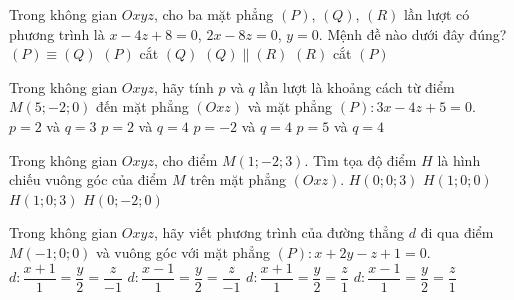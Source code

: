 \begin{ex}%
	Trong không gian $ Oxyz $, cho ba mặt phẳng $ (P) $, $ (Q) $, $ (R) $ lần lượt có phương trình là $ x-4z+8=0 $, $ 2x-8z=0 $, $ y=0 $. Mệnh đề nào dưới đây đúng?
	\choice
	{$ (P) \equiv (Q) $}
	{$ (P) $ cắt $ (Q) $}
	{$ (Q) \parallel (R)$}
	{\True $ (R) $ cắt $ (P) $}
\end{ex}
\begin{ex}%
	Trong không gian $ Oxyz $, hãy tính $ p $ và $ q $ lần lượt là khoảng cách từ điểm $ M(5;-2;0) $ đến mặt phẳng $ (Oxz) $ và mặt phẳng $ (P) \colon 3x-4z+5=0 $.
	\choice
	{$ p=2 $ và $ q=3 $}
	{\True $ p=2 $ và $ q=4 $}
	{$ p=-2 $ và $ q=4 $}
	{$ p=5 $ và $ q=4 $}
\end{ex}
\begin{ex}%
	Trong không gian $ Oxyz $, cho điểm $ M(1;-2;3) $. Tìm tọa độ điểm $ H $ là hình chiếu vuông góc của điểm $ M $ trên mặt phẳng $ (Oxz) $.
	\choice
	{$ H(0;0;3) $}
	{$ H(1;0;0) $}
	{\True $ H(1;0;3) $}
	{$ H(0;-2;0) $}
\end{ex}
\begin{ex}%
	Trong không gian $ Oxyz $, hãy viết phương trình của đường thẳng $ d $ đi qua điểm $ M(-1;0;0) $ và vuông góc với mặt phẳng $ (P) \colon x+2y-z+1=0 $.
	\choice
	{\True $ d \colon \dfrac{x+1}{1}=\dfrac{y}{2}=\dfrac{z}{-1} $}
	{$ d \colon \dfrac{x-1}{1}=\dfrac{y}{2}=\dfrac{z}{-1} $}
	{$ d \colon \dfrac{x+1}{1}=\dfrac{y}{2}=\dfrac{z}{1} $}
	{$ d \colon \dfrac{x-1}{1}=\dfrac{y}{2}=\dfrac{z}{1} $}
\end{ex}
